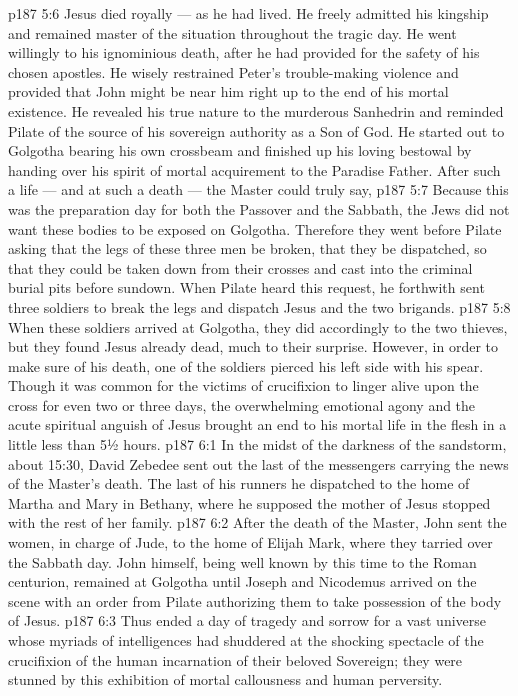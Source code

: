 \vs p187 5:6 \pc Jesus died royally --- as he had lived. He freely admitted his kingship and remained master of the situation throughout the tragic day. He went willingly to his ignominious death, after he had provided for the safety of his chosen apostles. He wisely restrained Peter’s trouble\hyp{}making violence and provided that John might be near him right up to the end of his mortal existence. He revealed his true nature to the murderous Sanhedrin and reminded Pilate of the source of his sovereign authority as a Son of God. He started out to Golgotha bearing his own crossbeam and finished up his loving bestowal by handing over his spirit of mortal acquirement to the Paradise Father. After such a life --- and at such a death --- the Master could truly say, 
\vs p187 5:7 \pc Because this was the preparation day for both the Passover and the Sabbath, the Jews did not want these bodies to be exposed on Golgotha. Therefore they went before Pilate asking that the legs of these three men be broken, that they be dispatched, so that they could be taken down from their crosses and cast into the criminal burial pits before sundown. When Pilate heard this request, he forthwith sent three soldiers to break the legs and dispatch Jesus and the two brigands.
\vs p187 5:8 When these soldiers arrived at Golgotha, they did accordingly to the two thieves, but they found Jesus already dead, much to their surprise. However, in order to make sure of his death, one of the soldiers pierced his left side with his spear. Though it was common for the victims of crucifixion to linger alive upon the cross for even two or three days, the overwhelming emotional agony and the acute spiritual anguish of Jesus brought an end to his mortal life in the flesh in a little less than 5½ hours.
\vs p187 6:1 In the midst of the darkness of the sandstorm, about 15:30, David Zebedee sent out the last of the messengers carrying the news of the Master’s death. The last of his runners he dispatched to the home of Martha and Mary in Bethany, where he supposed the mother of Jesus stopped with the rest of her family.
\vs p187 6:2 After the death of the Master, John sent the women, in charge of Jude, to the home of Elijah Mark, where they tarried over the Sabbath day. John himself, being well known by this time to the Roman centurion, remained at Golgotha until Joseph and Nicodemus arrived on the scene with an order from Pilate authorizing them to take possession of the body of Jesus.
\vs p187 6:3 Thus ended a day of tragedy and sorrow for a vast universe whose myriads of intelligences had shuddered at the shocking spectacle of the crucifixion of the human incarnation of their beloved Sovereign; they were stunned by this exhibition of mortal callousness and human perversity.
\quizlink
